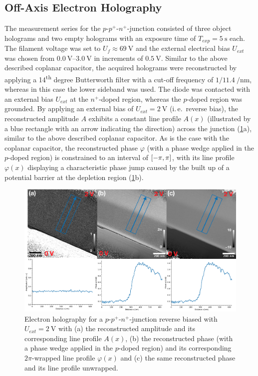\subsection{Off-Axis Electron Holography} \label{ssec:experimental-results-ppn-junction-off-axis-EH}
The measurement series for the $p$-$p^+$-$n^+$-junction consisted of three object holograms and two empty holograms with an exposure time of $T_{\mathit{exp}} = \SI{5}{\second}$ each. The filament voltage was set to $U_f \approx \SI{69}{\volt}$ and the external electrical bias $U_{\mathit{ext}}$ was chosen from $\SIrange{0.0}{3.0}{\volt}$ in increments of $\SI{0.5}{\volt}$. Similar to the above described coplanar capacitor, the acquired holograms were reconstructed by applying a 14\textsuperscript{th} degree Butterworth filter with a cut-off frequency of $1/\SI[per-mode=power]{11.4}{\per\nm}$, whereas in this case the lower sideband was used.
\newpage
The diode was contacted with an external bias $U_{\mathit{ext}}$ at the $n^+$-doped region, whereas the $p$-doped region was grounded. By applying an external bias of $U_{\mathit{ext}} = \SI{2}{\volt}$ (i.\,e.\ reverse bias), the reconstructed amplitude $A$ exhibits a constant line profile $A\left(x\right)$ (illustrated by a blue rectangle with an arrow indicating the direction) across the junction (\cref{fig:pn-junction-off-axis-EH-linescans}a), similar to the above described coplanar capacitor. As is the case with the coplanar capacitor, the reconstructed phase $\varphi$ (with a phase wedge applied in the $p$-doped region) is constrained to an interval of $\interval{-\pi}{\pi}$, with its line profile $\varphi\left(x\right)$ displaying a characteristic phase jump caused by the built up of a potential barrier at the depletion region (\cref{fig:pn-junction-off-axis-EH-linescans}b).
\begin{figure}[H]
	\centering
	\includegraphics[width=\textwidth]{Figures/Results/pn-Junction/Holography/pn-junction-off-axis-EH-linescans.pdf}
	\caption{Electron holography for a $p$-$p^+$-$n^+$-junction reverse biased with $U_{\mathit{ext}} = \SI{2}{\volt}$ with (a) the reconstructed amplitude and its corresponding line profile $A\left(x\right)$, (b) the reconstructed phase (with a phase wedge applied in the $p$-doped region) and its corresponding $2\pi$-wrapped line profile $\varphi\left(x\right)$ and (c) the same reconstructed phase and its line profile unwrapped.}
	\label{fig:pn-junction-off-axis-EH-linescans}
\end{figure}
